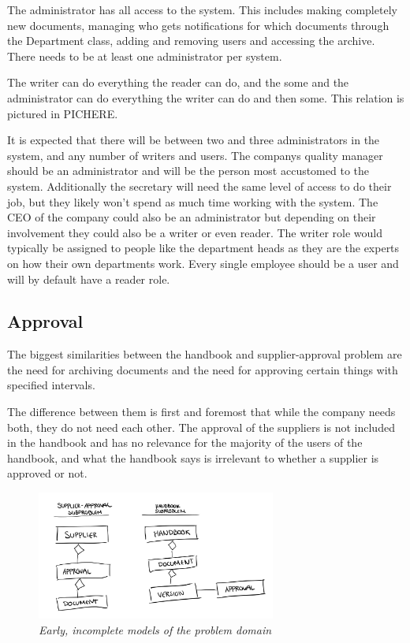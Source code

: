 The administrator has all access to the system. 
This includes making completely new documents, managing who gets notifications for which documents through the Department class, adding and removing users and accessing the archive.
There needs to be at least one administrator per system.

The writer can do everything the reader can do, and the some and the administrator can do everything the writer can do and then some. 
This relation is pictured in PICHERE.

It is expected that there will be between two and three administrators in the system, and any number of writers and users. 
The companys quality manager should be an administrator and will be the person most accustomed to the system. 
Additionally the secretary will need the same level of access to do their job, but they likely won't spend as much time working with the system. 
The CEO of the company could also be an administrator but depending on their involvement they could also be a writer or even reader.
The writer role would typically be assigned to people like the department heads as they are the experts on how their own departments work.
Every single employee should be a user and will by default have a reader role. 

\subsection{Approval}
The biggest similarities between the handbook and supplier-approval problem are the need for archiving documents and the need for approving certain things with specified intervals.

The difference between them is first and foremost that while the company needs both, they do not need each other.
The approval of the suppliers is not included in the handbook and has no relevance for the majority of the users of the handbook, and what the handbook says is irrelevant to whether a supplier is approved or not.

\begin{figure}[H]
	\centering
	\includegraphics[width=0.7\textwidth]{billeder/pseudoClassDiagram.jpg}
	\caption{\textit{Early, incomplete models of the problem domain
	}}
	\label{fig:PseudoClassDiagram}
\end{figure}

